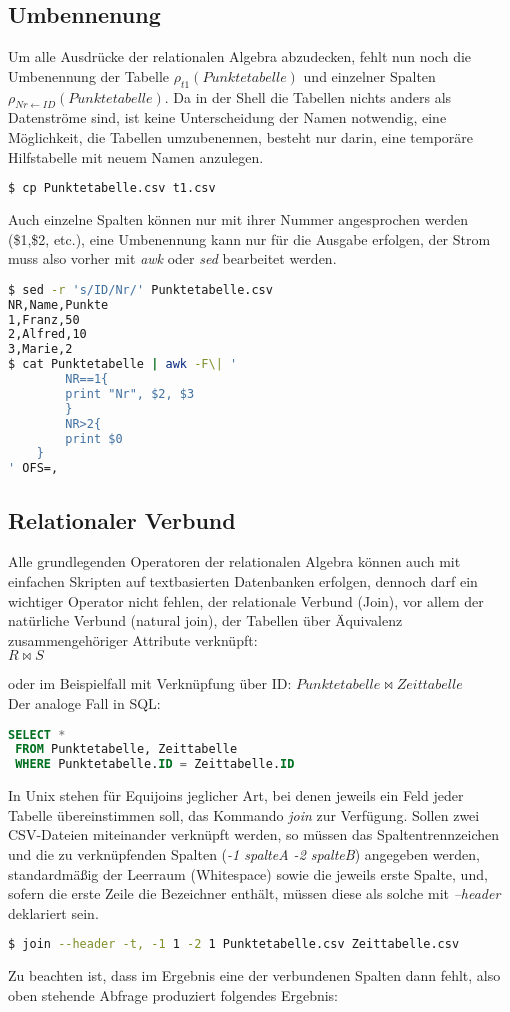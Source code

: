 \subsection{Umbennenung}
Um alle Ausdrücke der relationalen Algebra abzudecken, fehlt nun noch die Umbenennung der Tabelle $\rho_{t1}(Punktetabelle)$ und einzelner Spalten $\rho_{Nr \leftarrow ID}(Punktetabelle)$. Da in der Shell die Tabellen nichts anders als Datenströme sind, ist keine Unterscheidung der Namen notwendig, eine Möglichkeit, die Tabellen umzubenennen, besteht nur darin, eine temporäre Hilfstabelle mit neuem Namen anzulegen.
\begin{lstlisting}[language=Bash]
$ cp Punktetabelle.csv t1.csv
\end{lstlisting}
Auch einzelne Spalten können nur mit ihrer Nummer angesprochen werden (\$1,\$2, etc.), eine Umbenennung kann nur für die Ausgabe erfolgen, der Strom muss also vorher mit \textit{awk} oder \textit{sed} bearbeitet werden.
\begin{lstlisting}[language=Bash]
$ sed -r 's/ID/Nr/' Punktetabelle.csv 
NR,Name,Punkte
1,Franz,50
2,Alfred,10
3,Marie,2
$ cat Punktetabelle | awk -F\| '
        NR==1{
		print "Nr", $2, $3
        }
        NR>2{
		print $0
	}
' OFS=,
\end{lstlisting}

\subsection{Relationaler Verbund}
Alle grundlegenden Operatoren der relationalen Algebra können auch mit einfachen Skripten auf textbasierten Datenbanken erfolgen, dennoch darf ein wichtiger Operator nicht fehlen, der relationale Verbund (Join), vor allem der natürliche Verbund (natural join), der Tabellen über Äquivalenz zusammengehöriger Attribute verknüpft:\\

$R \Join S $ 

oder im Beispielfall mit Verknüpfung über ID: $ Punktetabelle \Join Zeittabelle$\\
Der analoge Fall in SQL:
\begin{lstlisting}[language=SQL]
 SELECT *
 FROM Punktetabelle, Zeittabelle
 WHERE Punktetabelle.ID = Zeittabelle.ID
\end{lstlisting}

In Unix stehen für Equijoins jeglicher Art, bei denen jeweils ein Feld jeder Tabelle übereinstimmen soll, das Kommando \textit{join} zur Verfügung. Sollen zwei CSV-Dateien miteinander verknüpft werden, so müssen das Spaltentrennzeichen und die zu verknüpfenden Spalten (\textit{-1 spalteA -2 spalteB}) angegeben werden, standardmäßig der Leerraum (Whitespace) sowie die jeweils erste Spalte, und, sofern die erste Zeile die Bezeichner enthält, müssen diese als solche mit \textit{--header} deklariert sein.
\begin{lstlisting}[language=Bash]
$ join --header -t, -1 1 -2 1 Punktetabelle.csv Zeittabelle.csv
\end{lstlisting}
Zu beachten ist, dass im Ergebnis eine der verbundenen Spalten dann fehlt, also oben stehende Abfrage produziert folgendes Ergebnis:\\

